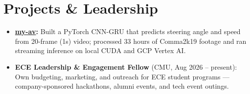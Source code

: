 \documentclass[11pt, letterpaper]{article}
\begin{document}
\section{Projects \& Leadership}
\begin{itemize}
  \item \textbf{\href{https://github.com/lordphone/my-av}{my-av}:} Built a PyTorch CNN-GRU that predicts steering angle and speed from 20-frame (1s) video; processed 33 hours of Comma2k19 footage and ran streaming inference on local CUDA and GCP Vertex AI.
  \item \textbf{ECE Leadership \& Engagement Fellow} (CMU, Aug 2026 -- present): Own budgeting, marketing, and outreach for ECE student programs --- company-sponsored hackathons, alumni events, and tech event outings.
\end{itemize}
\end{document}
